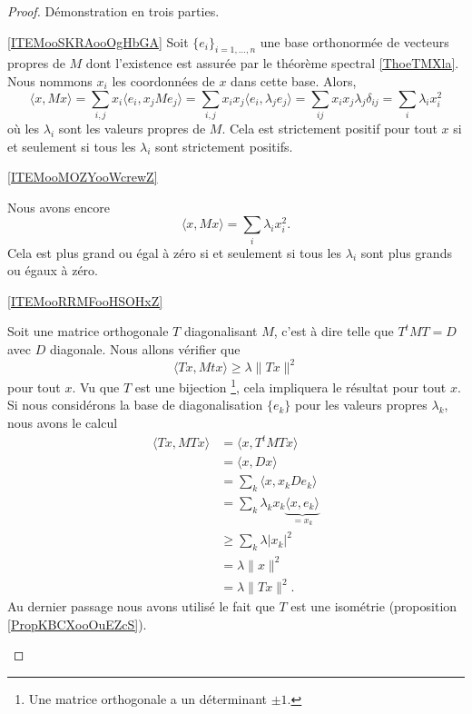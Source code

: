 \begin{proof}
    Démonstration en trois parties.
    \begin{subproof}
    \item[\ref{ITEMooSKRAooOgHbGA}]
    Soit \( \{ e_i \}_{i=1,\ldots, n}\) une base orthonormée de vecteurs propres de \( M\) dont l'existence est assurée par le théorème spectral \ref{ThoeTMXla}. Nous nommons \( x_i\) les coordonnées de \( x\) dans cette base. Alors,
    \begin{equation}
        \langle x,Mx \rangle =\sum_{i,j}x_i\langle e_i, x_jMe_j\rangle =\sum_{i,j}x_ix_j\langle e_i, \lambda_je_j\rangle =\sum_{ij}x_ix_j\lambda_j\delta_{ij}=\sum_i\lambda_ix_i^2
    \end{equation}
    où les \( \lambda_i\) sont les valeurs propres de \( M\). Cela est strictement positif pour tout \( x\) si et seulement si tous les \( \lambda_i\) sont strictement positifs.
\item[\ref{ITEMooMOZYooWcrewZ}]

    Nous avons encore 
    \begin{equation}
        \langle x, Mx\rangle =\sum_{i}\lambda_ix_i^2.
    \end{equation}
    Cela est plus grand ou égal à zéro si et seulement si tous les \( \lambda_i\) sont plus grands ou égaux à zéro.
        
\item[\ref{ITEMooRRMFooHSOHxZ}]

        Soit une matrice orthogonale \( T\) diagonalisant \( M\), c'est à dire telle que \( T^tMT=D\) avec \( D\) diagonale. Nous allons vérifier que 
        \begin{equation}
            \langle Tx, Mtx\rangle \geq \lambda\| Tx \|^2
        \end{equation}
        pour tout \( x\). Vu que \( T\) est une bijection \footnote{Une matrice orthogonale a un déterminant $\pm 1$.}, cela impliquera le résultat pour tout \( x\). Si nous considérons la base de diagonalisation \( \{ e_k \}\) pour les valeurs propres \( \lambda_k\), nous avons le calcul
       \begin{subequations}
            \begin{align}
                \langle Tx, MTx\rangle &=\langle x, T^tMTx\rangle \\
                &=\langle x, Dx\rangle \\
                &=\sum_k\langle x, x_kDe_k\rangle \\
                &=\sum_k\lambda_kx_k \underbrace{\langle x, e_k\rangle }_{=x_k}\\
                &\geq \sum_k\lambda| x_k |^2\\
                &=\lambda\| x \|^2\\
                &=\lambda\| Tx \|^2.
            \end{align}
        \end{subequations}
        Au dernier passage nous avons utilisé le fait que \( T\) est une isométrie (proposition \ref{PropKBCXooOuEZcS}).
    \end{subproof}
\end{proof}

